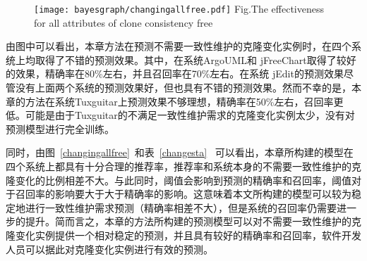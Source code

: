 \begin{figure}[h]
\centering
\texttt{[image: bayesgraph/changingallfree.pdf]}
{Fig.$\!$}{The effectiveness for all attributes of clone consistency free}
\vspace{-1em}
\end{figure}

由图中可以看出，本章方法在预测不需要一致性维护的克隆变化实例时，在四个系统上均取得了不错的预测效果。其中，在系统ArgoUML和 jFreeChart取得了较好的效果，精确率在80\%左右，并且召回率在70\%左右。在系统 jEdit的预测效果尽管没有上面两个系统的预测效果好，但也具有不错的预测效果。然而不幸的是，本章的方法在系统Tuxguitar上预测效果不够理想，精确率在50\%左右，召回率更低。可能是由于Tuxguitar的不满足一致性维护需求的克隆变化实例太少，没有对预测模型进行完全训练。

同时，由图~\ref{changingallfree}~和表~\ref{changesta}~ 可以看出，本章所构建的模型在四个系统上都具有十分合理的推荐率，推荐率和系统本身的不需要一致性维护的克隆变化的比例相差不大。与此同时，阈值会影响到预测的精确率和召回率，阈值对于召回率的影响要大于大于精确率的影响。这意味着本文所构建的模型可以较为稳定地进行一致性维护需求预测（精确率相差不大），但是系统的召回率仍需要进一步的提升。简而言之，本章的方法所构建的预测模型可以对不需要一致性维护的克隆变化实例提供一个相对稳定的预测，并且具有较好的精确率和召回率，软件开发人员可以据此对克隆变化实例进行有效的预测。

